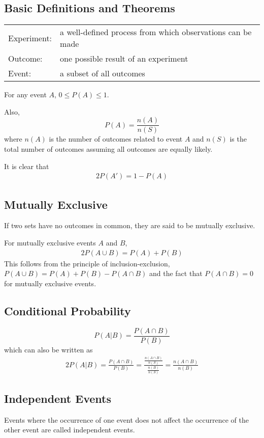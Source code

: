 \documentclass[letterpaper, 12pt]{report}
\theoremstyle{definition}
\numberwithin{equation}{section}
\begin{document}
\subsection{Basic Definitions and Theorems}
\begin{tabularx}{\textwidth}{l X}
	Experiment: & a well-defined process from which observations can be made \\
	Outcome: & one possible result of an experiment \\
	Event: & a subset of all outcomes
\end{tabularx}

\bigskip \noindent
For any event $A$, $0 \le P(A) \le 1$.

Also,
\begin{equation}
	P(A) = \frac{n(A)}{n(S)}
\end{equation}
where $n(A)$ is the number of outcomes related to event $A$ and $n(S)$ is the total number of outcomes assuming all outcomes are equally likely.

It is clear that
\begin{alignat}{2}{}
	P(A') = 1 - P(A)
\end{alignat}

\subsection{Mutually Exclusive}
If two sets have no outcomes in common, they are said to be mutually exclusive.

For mutually exclusive events $A$ and $B$,
\begin{alignat}{2}{}
	P(A \cup B) = P(A) + P(B)
\end{alignat}
This follows from the principle of inclusion-exclusion, $P(A \cup B) = P(A) + P(B) - P(A \cap B)$ and the fact that $P(A \cap B)=0$ for mutually exclusive events.

\subsection{Conditional Probability}
\begin{equation}
	P(A|B) = \frac{P(A \cap B)}{P(B)}
	\label{cond}
\end{equation}
which can also be written as
\begin{alignat}{2}{}
	P(A|B) = \frac{P(A \cap B)}{P(B)} = \frac{\frac{n(A\cap B)}{n(S)}}{\frac{n(B)}{n(S)}} = \frac{n(A\cap B)}{n(B)}
\end{alignat}

\subsection{Independent Events}
Events where the occurrence of one event does not affect the occurrence of the other event are called independent events.
\end{document}
